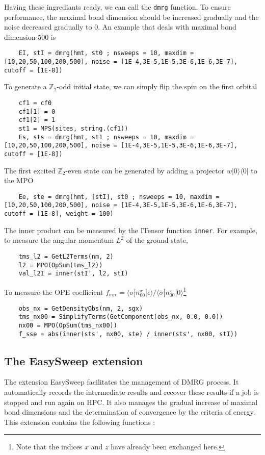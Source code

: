 \documentclass{timesjhep}
\begin{document}
Having these ingrediants ready, we can call the \lstinline|dmrg| function. To ensure performance, the maximal bond dimension should be increased gradually and the noise decreased gradually to 0. An example that deals with maximal bond dimension $500$ is 
\begin{lstlisting}
    EI, stI = dmrg(hmt, st0 ; nsweeps = 10, maxdim = [10,20,50,100,200,500], noise = [1E-4,3E-5,1E-5,3E-6,1E-6,3E-7], cutoff = [1E-8])
\end{lstlisting}
To generate a $\mathbb{Z}_2$-odd initial state, we can simply flip the spin on the first orbital
\begin{lstlisting}
    cf1 = cf0 
    cf1[1] = 0
    cf1[2] = 1
    st1 = MPS(sites, string.(cf1))
    Es, sts = dmrg(hmt, st1 ; nsweeps = 10, maxdim = [10,20,50,100,200,500], noise = [1E-4,3E-5,1E-5,3E-6,1E-6,3E-7], cutoff = [1E-8])
\end{lstlisting}
The first excited $\mathbb{Z}_2$-even state can be generated by adding a projector $w|0\rangle\langle0|$ to the MPO 
\begin{lstlisting}
    Ee, ste = dmrg(hmt, [stI], st0 ; nsweeps = 10, maxdim = [10,20,50,100,200,500], noise = [1E-4,3E-5,1E-5,3E-6,1E-6,3E-7], cutoff = [1E-8], weight = 100)
\end{lstlisting}

The inner product can be measured by the ITensor function \lstinline|inner|. For example, to measure the angular momentum $L^2$ of the ground state,
\begin{lstlisting}
    tms_l2 = GetL2Terms(nm, 2)
    l2 = MPO(OpSum(tms_l2))
    val_l2I = inner(stI', l2, stI)
\end{lstlisting}
To measure the OPE coefficient $f_{\sigma\sigma\epsilon}=\langle \sigma|n^x_{00}|\epsilon\rangle/\langle \sigma|n^x_{00}|0\rangle$\footnote{Note that the indices $x$ and $z$ have already been exchanged here. }
\begin{lstlisting}
    obs_nx = GetDensityObs(nm, 2, sgx)
    tms_nx00 = SimplifyTerms(GetComponent(obs_nx, 0.0, 0.0))
    nx00 = MPO(OpSum(tms_nx00))
    f_sse = abs(inner(sts', nx00, ste) / inner(sts', nx00, stI))
\end{lstlisting}

\subsection{The EasySweep extension}

The extension EasySweep facilitates the management of DMRG process. It automatically records the intermediate results and recover these results if a job is stopped and run again on HPC. It also manages the gradual increase of maximal bond dimensions and the determination of convergence by the criteria of energy. This extension contains the following functions :
\end{document}

